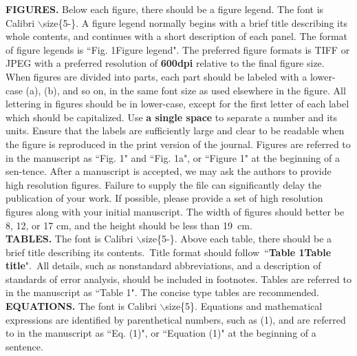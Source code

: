\documentclass[10.5pt,compsoc]{ICN}
\theoremstyle{mystyle}
\begin{document}
\begin{strip}
\end{strip}
\clearpage
{}
\noindent
\textbf{FIGURES. }Below each figure, there should be a figure legend. The font is Calibri $\backslash$size\{5-\}. A figure legend normally begins with a brief title describing its whole contents, and continues with a short description of each panel. The format of figure legends is ``Fig. 1\quad Figure legend". The preferred figure formats is TIFF or JPEG with a preferred resolution of \textbf{600dpi} relative to the final figure size. When figures are divided into parts, each part should be labeled with a lower-case (a), (b), and so on, in the same font size as used elsewhere in the figure. All lettering in figures should be in lower-case, except for the first letter of each label which should be capitalized. Use \textbf{a single space} to separate a number and its units. Ensure that the labels are sufficiently large and clear to be readable when the figure is reproduced in the print version of the journal. Figures are referred to in the manuscript as ``Fig. 1" and ``Fig. 1a", or ``Figure 1" at the beginning of a sen-tence. After a manuscript is accepted, we may ask the authors to provide high resolution figures. Failure to supply the file can significantly delay the publication of your work. If possible, please provide a set of high resolution figures along with your initial manuscript. The width of figures should better be 8, 12, or 17 cm, and the height should be less than \mbox{19 cm.}\\

\noindent
\textbf{TABLES.} The font is Calibri $\backslash$size\{5-\}. Above each table, there should be a brief title describing its contents.~Title format should follow~``\textbf{Table 1\quad Table title}".~All details, such as nonstandard abbreviations, and a description of standards of error analysis, should be included in footnotes. Tables are referred to in the manuscript as ``Table 1". The concise type tables are recommended.\\

\noindent
\textbf{EQUATIONS.} The font is Calibri $\backslash$size\{5\}. Equations and mathematical expressions are identified by parenthetical numbers, such as (1), and are referred to in the manuscript as ``Eq. (1)", or ``Equation (1)" at the beginning of a sentence.
\end{document}
